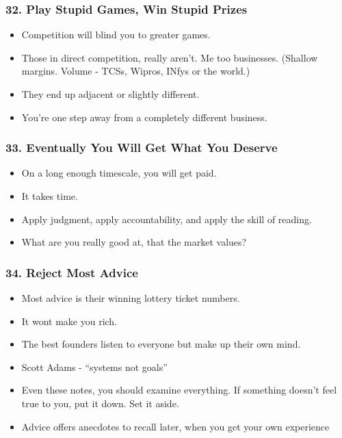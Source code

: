 \begin{frame}[fragile]
\frametitle{32. Play Stupid Games, Win Stupid Prizes}
\begin{itemize}
\item Competition will blind you to greater games.
\item Those in direct competition, really aren't. Me too businesses. (Shallow margins. Volume - TCSs, Wipros, INfys or the world.)
\item They end up adjacent or slightly different. 
\item You're one step away from a completely different business.
\end{itemize}
\end{frame}

\begin{frame}[fragile]
\frametitle{33. Eventually You Will Get What You Deserve}
\begin{itemize}
\item On a long enough timescale, you will get paid.
\item It takes time.
\item  Apply judgment, apply accountability, and apply the skill of reading.
\item What are you really good at, that the market values?
\end{itemize}
\end{frame}

\begin{frame}[fragile]
\frametitle{34. Reject Most Advice}
\begin{itemize}
\item Most advice is their winning lottery ticket numbers. 
\item It wont make you rich.
\item The best founders listen to everyone but make up their own mind.
\item Scott Adams - ``systems not goals''
\item Even these notes,  you should examine everything. If something doesn't feel true to you, put it down. Set it aside.
\item Advice offers anecdotes to recall later, when you get your own experience
\end{itemize}
\end{frame}

